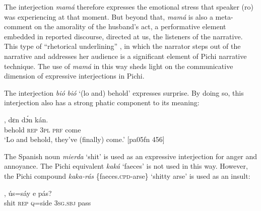 \ea%
    \label{ex:key:1645}
\z\z

The interjection \textit{mamá} therefore expresses the emotional stress that speaker (ro) was experiencing at that moment. But beyond that, \textit{mamá} is also a meta-comment on the amorality of the husband’s act, a performative element embedded in reported discourse, directed at us, the listeners of the narrative. This type of “rhetorical underlining” \citep[39]{Longacre1996}, in which the narrator steps out of the narrative and addresses her audience is a significant element of Pichi narrative technique. The use of \textit{mamá} in this way sheds light on the communicative dimension of expressive interjections in Pichi.


The interjection \textit{bió bió} ‘(lo and) behold’ expresses surprise. By doing so, this interjection also has a strong phatic component to its meaning: 



\ea%
    \label{ex:key:1646}
    \gll {}    ,  dɛn  dɔ́n  kán.\\
behold  \textsc{rep}  \textsc{3pl}  \textsc{prf}  come\\

\glt ‘Lo and behold, they’ve (finally) come.’ [pa05fn 456]
\z

The Spanish noun \textit{mierda} ‘shit’ is used as an expressive interjection for anger and annoyance. The Pichi equivalent \textit{kaká} ‘faeces’ is not used in this way. However, the Pichi compound \textit{kaka-rás} \{faeces.\textsc{cpd}{}-arse\} ‘shitty arse’ is used as an insult: 


\ea%
    \label{ex:key:1647}
    \gll {}  ,  ús=sáy  e    pás?\\
shit    \textsc{rep}    \textsc{q}=side  \textsc{3sg.sbj}  pass\\

